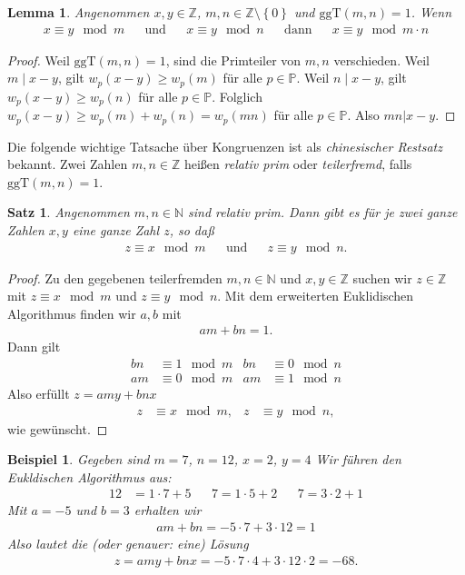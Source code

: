 \documentclass[10pt,reqno]{amsart}
\numberwithin{equation}{section}
\renewcommand\oe{\"o}
\newcommand\ue{\"u}
\newcommand\ggt{\ggT}
\newcommand\ggT{\mathrm{ggT}}
\newcommand\NN{\mathbb N}
\newcommand\ZZ{\mathbb Z}
\newcommand\PP{\mathbb P}
\newtheorem{example}[definition]{Beispiel}
\newtheorem{theorem}[definition]{Satz}
\newtheorem{lemma}[definition]{Lemma}
\newcommand\cbc[1]{\left\{{#1}\right\}}
\begin{document}
\begin{lemma}\label{lem_modgcd}
	Angenommen $x,y\in\ZZ$, $m,n\in\ZZ\setminus\cbc 0$ und $\ggt(m,n)=1$.	
	Wenn
	\begin{align*}
		x\equiv y\mod m&&\mbox{und}&&x\equiv y\mod n&&\mbox{dann}&&x\equiv y\mod m\cdot n
	\end{align*}
\end{lemma}
\begin{proof}
	Weil $\ggt(m,n)=1$, sind die Primteiler von $m,n$ verschieden.
	Weil $m\mid x-y$, gilt $w_p(x-y)\geq w_p(m)$ f\ue r alle $p\in\PP$.
	Weil $n\mid x-y$, gilt $w_p(x-y)\geq w_p(n)$ f\ue r alle $p\in\PP$.
	Folglich $w_p(x-y)\geq w_p(m)+w_p(n)=w_p(mn)$ f\ue r alle $p\in\PP$.
	Also $mn|x-y$.
\end{proof}

Die folgende wichtige Tatsache \"uber Kongruenzen ist als {\em chinesischer Restsatz} bekannt.
Zwei Zahlen $m,n\in\ZZ$ hei\ss en {\em relativ prim} oder {\em teilerfremd}, falls $\ggt(m,n)=1$.

\begin{theorem}\label{thm_chinese}
	Angenommen $m,n\in\NN$ sind relativ prim.
	Dann gibt es f\ue r je zwei ganze Zahlen $x,y$ eine ganze Zahl $z$, so da\ss\
	\begin{align*}
		z\equiv x\mod m&&\mbox{und}&&z\equiv y\mod n.
	\end{align*}
\end{theorem}
\begin{proof}
	Zu den gegebenen teilerfremden $m,n\in\NN$ und $x,y\in\ZZ$ suchen wir $z\in\ZZ$ mit $z\equiv x\mod m$ und $z\equiv y\mod n$.
	Mit dem erweiterten Euklidischen Algorithmus finden wir $a,b$ mit
	\begin{align*}
	am+bn=1.
	\end{align*}
	Dann gilt
	\begin{align*}
		bn&\equiv 1\mod m&bn&\equiv0\mod n\\
		am&\equiv 0\mod m&am&\equiv1\mod n
	\end{align*}
	Also erf\ue llt $z=amy+bnx$
				\begin{align*}
					z&\equiv x\mod m,&z&\equiv y\mod n,
				\end{align*}
	wie gew\"unscht.
\end{proof}

\begin{example}
	Gegeben sind $m=7$, $n=12$, $x=2$, $y=4$
	Wir f\"uhren den Eukldischen Algorithmus aus:
	\begin{align*}
		12&=1\cdot 7+5&&7=1\cdot 5+2&&7=3\cdot 2+1
	\end{align*}
	Mit $a=-5$ und $b=3$ erhalten wir
	\begin{align*}
		am+bn=-5\cdot 7+3\cdot 12=1
	\end{align*}
	Also lautet die (oder genauer: eine) L\oe sung
	\begin{align*}
		z=amy+bnx=-5\cdot 7\cdot 4+3\cdot 12\cdot 2=-68.
	\end{align*}
\end{example}
\end{document}
